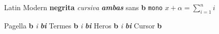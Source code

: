 \documentclass{article}
\begin{document}
Latin Modern \textbf{negrita} \textit{cursiva} \textbf{\textit{ambas}} \textsf{sans \textbf{b}}
\texttt{mono} $x + \alpha = \sum_{i=1}^{n} i$

 Pagella \textbf{b} \textit{i} \textbf{\textit{bi}}
 Termes \textbf{b} \textit{i} \textbf{\textit{bi}}
 Heros \textbf{b} \textit{i} \textbf{\textit{bi}}
 Cursor \textbf{b}
\end{document}
